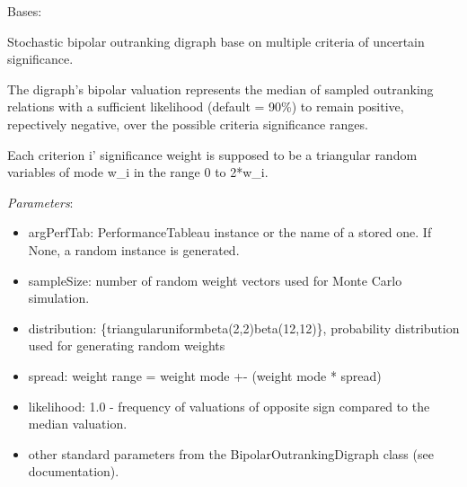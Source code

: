 \documentclass[letterpaper,10pt,english]{sphinxmanual}
\begin{document}
\begin{fulllineitems}
\label{techDoc:outrankingDigraphs.StochasticBipolarOutrankingDigraph}
Bases: {\hyperref[techDoc:outrankingDigraphs.BipolarOutrankingDigraph]{}}

Stochastic bipolar outranking digraph base on multiple criteria of uncertain significance.

The digraph's bipolar valuation represents the median of sampled outranking relations with a
sufficient likelihood (default = 90\%) to remain positive, repectively negative,
over the possible criteria significance ranges.

Each criterion i' significance weight is supposed to
be a triangular random variables of mode w\_i in the range 0 to 2*w\_i.

\emph{Parameters}:
\begin{itemize}
\item {} 
argPerfTab: PerformanceTableau instance or the name of a stored one.
If None, a random instance is generated.

\item {} 
sampleSize: number of random weight vectors used for Monte Carlo simulation.

\item {} 
distribution: \{triangular\textbar{}uniform\textbar{}beta(2,2)\textbar{}beta(12,12)\}, probability distribution used for generating random weights

\item {} 
spread: weight range = weight mode +- (weight mode * spread)

\item {} 
likelihood: 1.0 - frequency of valuations of opposite sign compared to the median valuation.

\item {} 
other standard parameters from the BipolarOutrankingDigraph class (see documentation).

\end{itemize}


\end{fulllineitems}
\end{document}
